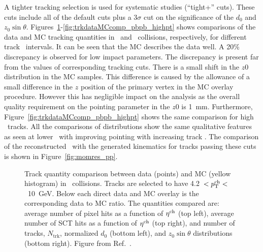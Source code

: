 A tighter tracking selection is used for systematic studies (``tight+'' cuts).
These cuts include all of the default cuts plus a 3$\sigma$ cut on the significance of the $d_0$ and $z_0 \sin\theta$.
Figures~\ref{fig:trkdataMCcomp_pp}-\ref{fig:trkdataMCcomp_pbpb_highpt} shows comparisons of the data and MC tracking quantities in \pp\ and \pbpb\ collisions, respectively, for different track \pT\ intervals.
It can be seen that the MC describes the data well.
A 20\% discrepancy is observed for low impact parameters.
The discrepancy is present far from the values of corresponding tracking cuts.
There is a small shift in the $z0$ distribution in the MC samples.
This difference is caused by the allowance of a small difference in the $z$ position of the primary vertex in the MC overlay procedure.
However this has negligible impact on the analysis as the overall quality requirement on the pointing parameter in the $z0$ is 1~mm.
Furthermore, Figure~\ref{fig:trkdataMCcomp_pbpb_highpt} shows the same comparison for high \pt\ tracks.
All the comparisons of distributions show the same qualitative features as seen at lower \pt\ with improving pointing with increasing track \pt.
The comparison of the reconstructed \pttrk\ with the generated kinematics for tracks passing these cuts is shown in Figure~\ref{fig:momres_pp}.

\begin{figure}
\caption{Track quantity comparison between data (points) and MC (yellow histogram) in \pp\ collisions.
Tracks are selected to have 4.2~$<\mbox{$p_{\mathrm{T}}^{\mathrm{ch}}$}<$~10~GeV.
Below each direct data and MC overlay is the corresponding data to MC ratio.
The quantities compared are: average number of pixel hits as a function of $\mbox{$\eta^{\mathrm{ch}}$}$ (top left), average number of SCT hits as a function of $\mbox{$\eta^{\mathrm{ch}}$}$ (top right), and number of tracks, $N_{\mathrm{trk}}$, normalized $d_0$ (bottom left), and $z_0 \sin\theta$ distributions (bottom right).
Figure from Ref.~\cite{Sickles:2235420}.}
\label{fig:trkdataMCcomp_pp}
\end{figure}

